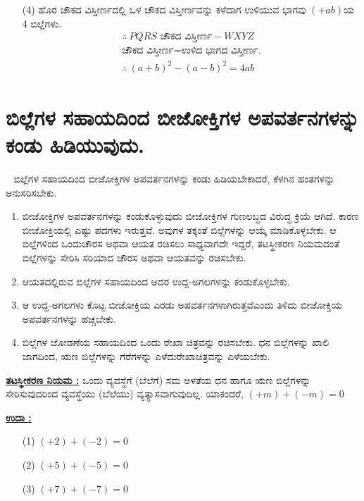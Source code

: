 \begin{enumerate}
\begin{itemize}
\item[(4)] ಹೊರ ಚೌಕದ ವಿಸ್ತೀರ್ಣದಲ್ಲಿ ಒಳ ಚೌಕದ ವಿಸ್ತೀರ್ಣವನ್ನು ಕಳೆದಾಗ ಉಳಿಯುವ ಭಾಗವು $(+ab)$ಯ 4 ಬಿಲ್ಲೆಗಳು.
\begin{gather*}
\therefore~ PQRS \text{ ಚೌಕದ ವಿಸ್ತೀರ್ಣ} - WXYZ\\
 \text{ಚೌಕದ ವಿಸ್ತೀರ್ಣ}  = \text{ಉಳಿದ ಭಾಗದ ವಿಸ್ತೀರ್ಣ.}\\
\therefore~ (a+b)^2 - (a-b)^2 = 4ab
\end{gather*} 
\end{itemize}
\end{enumerate}

\section{ಬಿಲ್ಲೆಗಳ ಸಹಾಯದಿಂದ ಬೀಜೋಕ್ತಿಗಳ ಅಪವರ್ತನಗಳನ್ನು ಕಂಡು ಹಿಡಿಯುವುದು.}\label{sec3.8}%
~
\vspace{-0.1cm}
ಬಿಲ್ಲೆಗಳ ಸಹಾಯದಿಂದ ಬೀಜೋಕ್ತಿಗಳ ಅಪವರ್ತನಗಳನ್ನು ಕಂಡು ಹಿಡಿಯಬೇಕಾದರೆ, ಕೆಳಗಿನ ಹಂತಗಳನ್ನು ಅನುಸರಿಸಬೇಕು. 
\begin{enumerate}
\item ಬೀಜೋಕ್ತಿಗಳ ಅಪವರ್ತನಗಳನ್ನು ಕಂಡುಕೊಳ್ಳುವುದು ಬೀಜೋಕ್ತಿಗಳ ಗುಣಲಬ್ಧದ ವಿರುದ್ಧ ಕ್ರಿಯೆ ಆಗಿದೆ. ಕಾರಣ ಬೀಜೋಕ್ತಿಯಲ್ಲಿ ಎಷ್ಟು ಪದಗಳು ಇರುತ್ತವೆ. ಅವುಗಳ ತಕ್ಕಂತೆ ಬಿಲ್ಲೆಗಳನ್ನು ಆಯ್ಕೆ ಮಾಡಿಕೊಳ್ಳಬೇಕು. ಆ ಬಿಲ್ಲೆಗಳಿಂದ ಒಂದು\break ಚೌರಸ ಅಥವಾ ಆಯತ ರಚಿಸಲು ಸಾಧ್ಯವಾಗದೇ ಇದ್ದರೆ, ತಟಸ್ಥೀಕರಣ ನಿಯಮದಂತೆ ಬಿಲ್ಲೆಗಳನ್ನು ಸೇರಿಸಿ ಸರಿಯಾದ ಚೌರಸ ಅಥವಾ ಆಯತವನ್ನು ರಚಿಸಬೇಕು. 
\item ಆಯತದಲ್ಲಿರುವ ಬಿಲ್ಲೆಗಳ ಸಹಾಯದಿಂದ ಅದರ ಉದ್ದ-ಅಗಲಗಳನ್ನು ಕಂಡುಕೊಳ್ಳಬೇಕು. 

\item ಆ ಉದ್ದ-ಅಗಲಗಳು ಕೊಟ್ಟ ಬೀಜೋಕ್ತಿಯ ಎರಡು ಅಪವರ್ತನಗಳಾಗಿರುತ್ತವೆ\break ಎಂದು ತಿಳಿದು ಬೀಜೋಕ್ತಿಯ ಅಪವರ್ತನಗಳನ್ನು ಹಚ್ಚಬೇಕು.


\item ಬಿಲ್ಲೆಗಳ ಜೋಡಣೆಯ ಸಹಾಯದಿಂದ ಒಂದು ರೇಖಾ ಚಿತ್ರವನ್ನು ರಚಿಸಬೇಕು.  ಧನ ಬಿಲ್ಲೆಗಳನ್ನು ಖಾಲಿ ಜಾಗದಿಂದ, ಋಣ ಬಿಲ್ಲೆಗಳನ್ನು ಗೆರೆಗಳನ್ನು ಎಳೆದು\break ರೇಖಾಚಿತ್ರವನ್ನು ಎಳೆಯಬೇಕು.
\end{enumerate}

\noindent
{\textbf{\underline{ತಟಸ್ಥೀಕರಣ ನಿಯಮ :}}} ಒಂದು ವ್ಯವಸ್ಥೆಗೆ (ಬೆಲೆಗೆ) ಸಮ ಅಳತೆಯ ಧನ ಹಾಗೂ ಋಣ ಬಿಲ್ಲೆಗಳನ್ನು ಸೇರಿಸುವುದರಿಂದ ವ್ಯವಸ್ಥೆಯು (ಬೆಲೆಯು) ವ್ಯತ್ಯಾಸವಾಗುವುದಿಲ್ಲ. ಯಾಕಂದರೆ, $(+m) + (-m) = 0$

\noindent
{\textbf{\underline{ಉದಾ :}}}
\begin{itemize}
\item [(1)] $(+2) + (-2) = 0$
\item [(2)] $(+5) + (-5) = 0$
\item [(3)] $(+7) + (-7) = 0$
\end{itemize}

